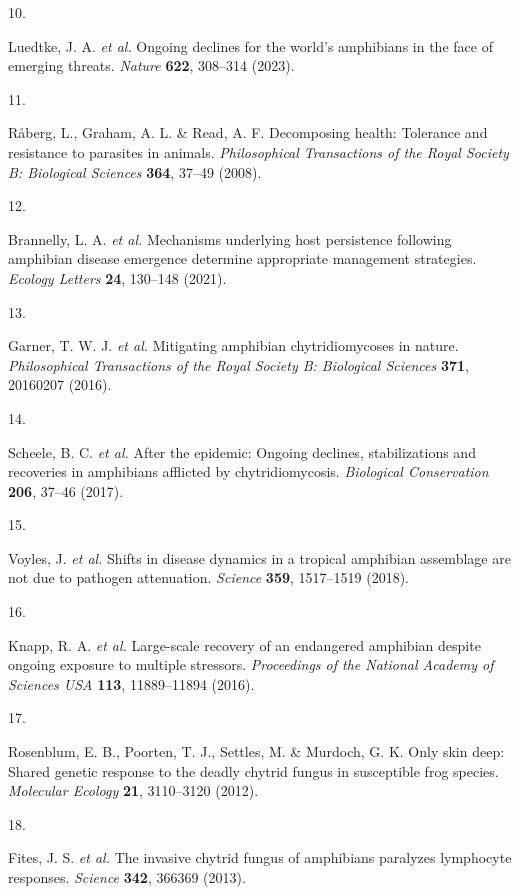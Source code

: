 \documentclass[
  letterpaper,
  DIV=11,
  numbers=noendperiod]{scrartcl}
\newlength{\cslhangindent}
\newlength{\csllabelwidth}
\newenvironment{CSLReferences}[2] %
 {\begin{list}{}{%
  \setlength{\itemindent}{0pt}
  \setlength{\leftmargin}{0pt}
  \setlength{\parsep}{0pt}
  \ifodd #1
   \setlength{\leftmargin}{\cslhangindent}
   \setlength{\itemindent}{-1\cslhangindent}
  \fi
  \setlength{\itemsep}{#2\baselineskip}}}
 {\end{list}}
\newcommand{\CSLLeftMargin}[1]{\parbox[t]{\csllabelwidth}{\strut#1\strut}}
\newcommand{\CSLRightInline}[1]{\parbox[t]{\linewidth - \csllabelwidth}{\strut#1\strut}}
\begin{document}
\begin{CSLReferences}{0}{0}
\CSLLeftMargin{10. }%
\CSLRightInline{Luedtke, J. A. \emph{et al.} Ongoing declines for the
world{'}s amphibians in the face of emerging threats. \emph{Nature}
\textbf{622}, 308--314 (2023).}

\CSLLeftMargin{11. }%
\CSLRightInline{Råberg, L., Graham, A. L. \& Read, A. F. Decomposing
health: Tolerance and resistance to parasites in animals.
\emph{Philosophical Transactions of the Royal Society B: Biological
Sciences} \textbf{364}, 37--49 (2008).}

\CSLLeftMargin{12. }%
\CSLRightInline{Brannelly, L. A. \emph{et al.} Mechanisms underlying
host persistence following amphibian disease emergence determine
appropriate management strategies. \emph{Ecology Letters} \textbf{24},
130--148 (2021).}

\CSLLeftMargin{13. }%
\CSLRightInline{Garner, T. W. J. \emph{et al.} Mitigating amphibian
chytridiomycoses in nature. \emph{Philosophical Transactions of the
Royal Society B: Biological Sciences} \textbf{371}, 20160207 (2016).}

\CSLLeftMargin{14. }%
\CSLRightInline{Scheele, B. C. \emph{et al.} After the epidemic: Ongoing
declines, stabilizations and recoveries in amphibians afflicted by
chytridiomycosis. \emph{Biological Conservation} \textbf{206}, 37--46
(2017).}

\CSLLeftMargin{15. }%
\CSLRightInline{Voyles, J. \emph{et al.} Shifts in disease dynamics in a
tropical amphibian assemblage are not due to pathogen attenuation.
\emph{Science} \textbf{359}, 1517--1519 (2018).}

\CSLLeftMargin{16. }%
\CSLRightInline{Knapp, R. A. \emph{et al.} Large-scale recovery of an
endangered amphibian despite ongoing exposure to multiple stressors.
\emph{Proceedings of the National Academy of Sciences USA} \textbf{113},
11889--11894 (2016).}

\CSLLeftMargin{17. }%
\CSLRightInline{Rosenblum, E. B., Poorten, T. J., Settles, M. \&
Murdoch, G. K. Only skin deep: Shared genetic response to the deadly
chytrid fungus in susceptible frog species. \emph{Molecular Ecology}
\textbf{21}, 3110--3120 (2012).}

\CSLLeftMargin{18. }%
\CSLRightInline{Fites, J. S. \emph{et al.} The invasive chytrid fungus
of amphibians paralyzes lymphocyte responses. \emph{Science}
\textbf{342}, 366369 (2013).}


\end{CSLReferences}
\end{document}
